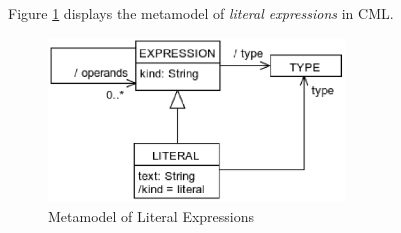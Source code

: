 Figure \ref{fig:meta:literals} displays the metamodel of
\emph{literal expressions} in CML.

\begin{figure}[H]
\centering
\includegraphics[width=0.7\textwidth]{metamodel/literals}
\caption{Metamodel of Literal Expressions}
\label{fig:meta:literals}
\end{figure}

